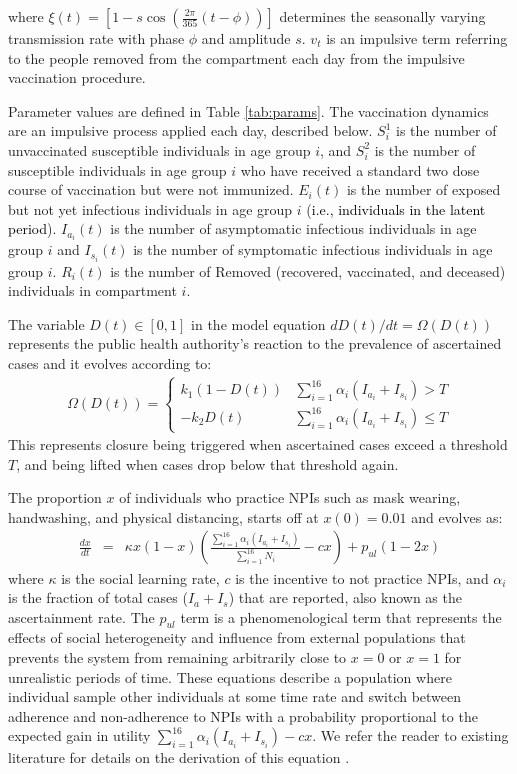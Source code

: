 where $\xi(t) = \left[1 - s \cos\left(\frac{2 \pi}{365} (t - \phi) \right)\right]$ determines the seasonally varying transmission rate with phase $\phi$ and amplitude $s$. $v_t$ is an impulsive term referring to the people removed from the compartment each day from the impulsive vaccination procedure.

\noindent Parameter values are defined in Table \ref{tab:params}. The vaccination dynamics are an impulsive process applied each day, described below. $S^{1}_i$ is the number of unvaccinated susceptible individuals in age group $i$, and $S^{2}_i$ is the number of susceptible individuals in age group $i$ who have received a standard two dose course of vaccination but were not immunized. $E_i(t)$ is the number of exposed but not yet infectious individuals in age group $i$ (\textcolor{black}{i.e., individuals in the latent period}). $I_{a_i}(t)$ is the number of asymptomatic infectious individuals in age group $i$ and $I_{s_i}(t)$ is the number of symptomatic infectious individuals in age group $i$. $R_i(t)$ is the number of Removed (recovered, vaccinated, and deceased) individuals in compartment $i$.

The variable $D(t) \in [0,1]$ in the model equation $dD(t)/dt = \Omega(D(t))$ represents the public health authority's reaction to the prevalence of ascertained cases and it evolves according to: 
\begin{eqnarray}
  \Omega(D(t)) =  \left\{
\begin{array}{ll}
    k_1 (1 - D(t)) &  \sum_{i=1}^{16}\alpha_i(I_{a_i} + I_{s_i}) > T\\
    - k_2 D(t) & \sum_{i=1}^{16}\alpha_i(I_{a_i} + I_{s_i}) \leq T
\end{array} 
\right. 
\end{eqnarray}
This represents closure being triggered when ascertained cases exceed a threshold $T$, and being lifted when cases drop below that threshold again. 

The proportion $x$ of individuals who practice NPIs such as mask wearing, handwashing, and physical distancing, starts off at $x(0)=0.01$ and evolves as: 
\begin{eqnarray}
\frac{dx}{dt} &= &\kappa x (1-x) \left(\frac{\sum_{i=1}^{16}\alpha_i(I_{a_i} + I_{s_i})}{\sum_{i=1}^{16} N_i} - c x\right) + p_{ul}(1-2 x) 
\label{xeqn_new}
\end{eqnarray}
where $\kappa$ is the social learning rate, $c$ is the incentive to not practice NPIs, and $\alpha_i$ is the fraction of total cases ($I_a + I_s$) that are reported, also known as the ascertainment rate.  The $p_{ul}$ term is a phenomenological term that represents the effects of social heterogeneity and influence from external populations that prevents the system from remaining arbitrarily close to $x=0$ or $x=1$ for unrealistic periods of time.  These equations describe a population where individual sample other individuals at some time rate and switch between adherence and non-adherence to NPIs with a probability proportional to the expected gain in utility $\sum_{i=1}^{16}\alpha_i(I_{a_i} + I_{s_i}) - c x$. We refer the reader to existing literature for details on the derivation of this equation \cite{bauch2005imitation,innes2013impact,thampi2018socio,bauch2012evolutionary,oraby2014influence}. 

